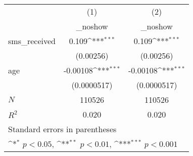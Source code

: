 {
\def\sym#1{\ifmmode^{#1}\else\(^{#1}\)\fi}
\begin{tabular}{l*{2}{c}}
\toprule
            &\multicolumn{1}{c}{(1)}&\multicolumn{1}{c}{(2)}\\
            &\multicolumn{1}{c}{\_noshow}&\multicolumn{1}{c}{\_noshow}\\
\midrule
sms\_received&       0.109\sym{***}&       0.109\sym{***}\\
            &   (0.00256)         &   (0.00256)         \\
\addlinespace
age         &    -0.00108\sym{***}&    -0.00108\sym{***}\\
            & (0.0000517)         & (0.0000517)         \\
\midrule
\(N\)       &      110526         &      110526         \\
\(R^{2}\)   &       0.020         &       0.020         \\
\bottomrule
\multicolumn{3}{l}{\footnotesize Standard errors in parentheses}\\
\multicolumn{3}{l}{\footnotesize \sym{*} \(p<0.05\), \sym{**} \(p<0.01\), \sym{***} \(p<0.001\)}\\
\end{tabular}
}

